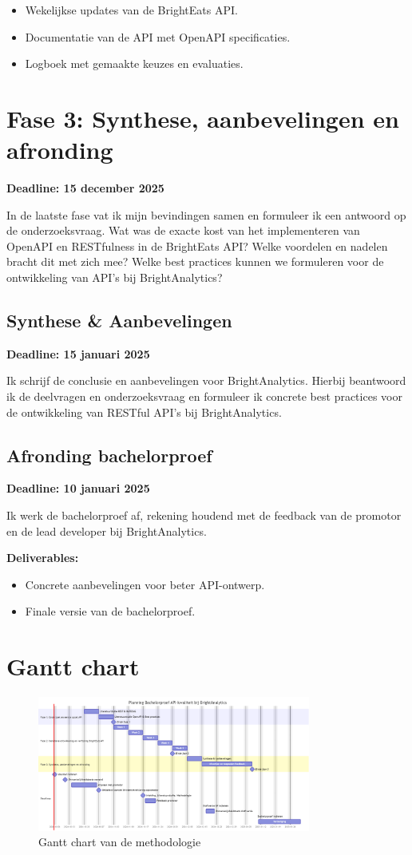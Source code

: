 \begin{itemize}
  \item Wekelijkse updates van de BrightEats API.
  \item Documentatie van de API met OpenAPI specificaties.
  \item Logboek met gemaakte keuzes en evaluaties.
\end{itemize}

\section{Fase 3: Synthese, aanbevelingen en afronding}

\textbf{Deadline: 15 december 2025}

\bigskip
In de laatste fase vat ik mijn bevindingen samen en formuleer ik een antwoord op de onderzoeksvraag. Wat was de exacte kost van het implementeren van OpenAPI en RESTfulness in de BrightEats API? Welke voordelen en nadelen bracht dit met zich mee? Welke best practices kunnen we formuleren voor de ontwikkeling van API's bij BrightAnalytics?

\subsection{Synthese \& Aanbevelingen}

\textbf{Deadline: 15 januari 2025}

\bigskip
Ik schrijf de conclusie en aanbevelingen voor BrightAnalytics. Hierbij beantwoord ik de deelvragen en onderzoeksvraag en formuleer ik concrete best practices voor de ontwikkeling van RESTful API's bij BrightAnalytics.

\subsection{Afronding bachelorproef}

\textbf{Deadline: 10 januari 2025}

\bigskip
Ik werk de bachelorproef af, rekening houdend met de feedback van de promotor en de lead developer bij BrightAnalytics.

\textbf{Deliverables:}

\begin{itemize}
  \item Concrete aanbevelingen voor beter API-ontwerp.
  \item Finale versie van de bachelorproef.
\end{itemize}

\section{Gantt chart}

\begin{figure}[H]
  \centering
  \includegraphics[width=0.8\textwidth]{gantt.png}
  \caption{Gantt chart van de methodologie}
  \label{fig:gantt}
\end{figure}
